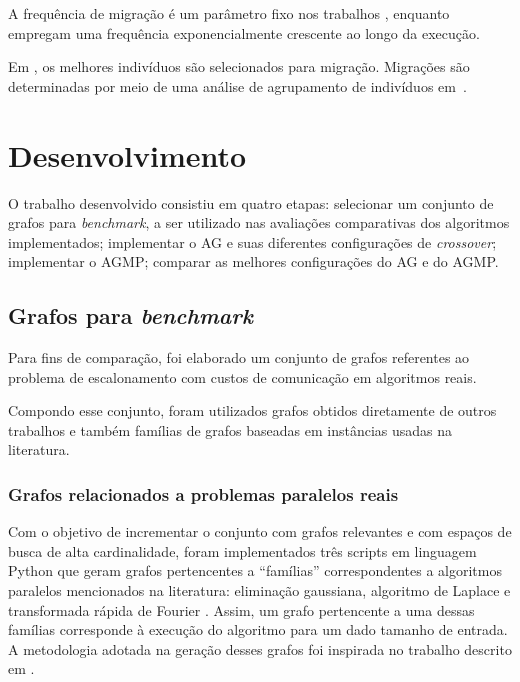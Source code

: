 \documentclass[fleqn,10pt]{SelfArx} %
\begin{document}
A frequência de migração é um parâmetro fixo nos trabalhos \cite{Muhlenbein:1991:PPG:1746086.1746158,Qi2000,Han,Gehring,Srinivasa:2007:SMM:1279013.1279229,Morady}, enquanto 
\citeauthor{Kwok:1997:ESA:274066.274077} empregam uma frequência exponencialmente crescente ao longo da execução.

Em \cite{Muhlenbein:1991:PPG:1746086.1746158,Kwok:1997:ESA:274066.274077,Qi2000,Han,Gehring,Srinivasa:2007:SMM:1279013.1279229,Morady},
os melhores indivíduos são selecionados para migração. Migrações são determinadas por meio de uma análise de agrupamento de indivíduos em~\cite{Yao}. 


\section{Desenvolvimento}

O trabalho desenvolvido consistiu em quatro etapas: selecionar um conjunto de grafos para \textit{benchmark}, a ser utilizado nas avaliações comparativas dos algoritmos implementados; implementar o AG e suas diferentes configurações de \textit{crossover}; implementar o AGMP; comparar as melhores configurações do AG e do AGMP.

\subsection{Grafos para \textit{benchmark}}
\label{sec:grafos}
Para fins de comparação, foi elaborado um conjunto de grafos referentes ao problema de escalonamento com custos de comunicação em algoritmos reais.


Compondo esse conjunto, foram utilizados grafos obtidos diretamente de outros trabalhos e também famílias de grafos baseadas em instâncias usadas na literatura.


\subsubsection{Grafos relacionados a problemas paralelos reais}

Com o objetivo de incrementar o conjunto com grafos relevantes e com espaços de busca de alta cardinalidade, foram implementados três scripts em linguagem Python que geram grafos pertencentes a ``famílias'' correspondentes a algoritmos paralelos mencionados na literatura: eliminação gaussiana, algoritmo de Laplace e transformada rápida de Fourier \cite{olteanu}. Assim, um grafo pertencente a uma dessas famílias corresponde à execução do algoritmo para um dado tamanho de entrada. A metodologia adotada na  geração desses grafos foi inspirada no trabalho descrito em \cite{olteanu}.
\end{document}
